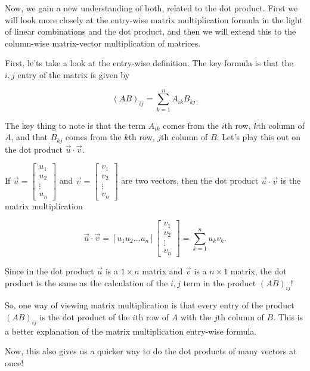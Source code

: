 \documentclass{ximera}
\begin{document}
Now, we gain a new understanding of both, related to the dot product. First we will look more closely at the entry-wise matrix multiplication formula in the light of linear combinations and the dot product, and then we will extend this to the column-wise matrix-vector multiplication of matrices.

First, le'ts take a look at the entry-wise definition. The key formula is that the $i,j$ entry of the matrix is given by 

$$(AB)_{ij}=\sum_{k=1}^n A_{ik}B_{kj}.$$

The key thing to note is that the term $A_{ik}$ comes from the $i$th row, $k$th column of $A$, and that $B_{kj}$ comes from the $k$th row, $j$th column of $B$. Let's play this out on the dot product $\vec{u}\cdot\vec{v}$.

\begin{example}
   If $\vec{u}=\begin{bmatrix}
      u_1\\u_2\\\vdots\\u_n
   \end{bmatrix}$ and $\vec{v}=\begin{bmatrix}
      v_1\\v_2\\\vdots\\v_n
   \end{bmatrix}$ are two vectors, then the dot product $\vec{u}\cdot\vec{v}$ is the matrix multiplication

   $$\vec{u}\cdot\vec{v}=\left[u_1 u_2 \ldots u_n\right]\begin{bmatrix}
      v_1 \\ v_2 \\ \vdots \\ v_n
   \end{bmatrix}=\sum_{k=1}^nu_kv_k.$$


\end{example}

Since in the dot product $\vec{u}$ is a $1\times n$ matrix and $\vec{v}$ is a $n\times 1$ matrix, the dot product is the same as the calculation of the $i,j$ term in the product $(AB)_{ij}$!

So, one way of viewing matrix multiplication is that every entry of the product $(AB)_{ij}$ is the dot product of the $i$th row of $A$ with the $j$th column of $B$. This is a better explanation of the matrix multiplication entry-wise formula.

Now, this also gives us a quicker way to do the dot products of many vectors at once!
\end{document}
